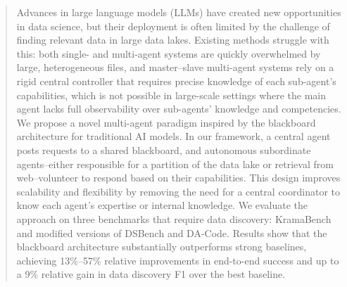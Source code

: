 \begin{abstract}
  Advances in large language models (LLMs) have created new opportunities in data science, but their deployment is often limited by the challenge of finding relevant data in large data lakes. Existing methods struggle with this: both single- and multi-agent systems are quickly overwhelmed by large, heterogeneous files, and master–slave multi-agent systems rely on a rigid central controller that requires precise knowledge of each sub-agent’s capabilities, which is not possible in large-scale settings where the main agent lacks full observability over sub-agents’ knowledge and competencies. We propose a novel multi-agent paradigm inspired by the blackboard architecture for traditional AI models. In our framework, a central agent posts requests to a shared blackboard, and autonomous subordinate agents--either responsible for a partition of the data lake or retrieval from web--volunteer to respond based on their capabilities. This design improves scalability and flexibility by removing the need for a central coordinator to know each agent’s expertise or internal knowledge. We evaluate the approach on three benchmarks that require data discovery: KramaBench and modified versions of DSBench and DA-Code. Results show that the blackboard architecture substantially outperforms strong baselines, achieving 13\%–57\% relative improvements in end-to-end success and up to a 9\% relative gain in data discovery F1 over the best baseline. 
\end{abstract}
